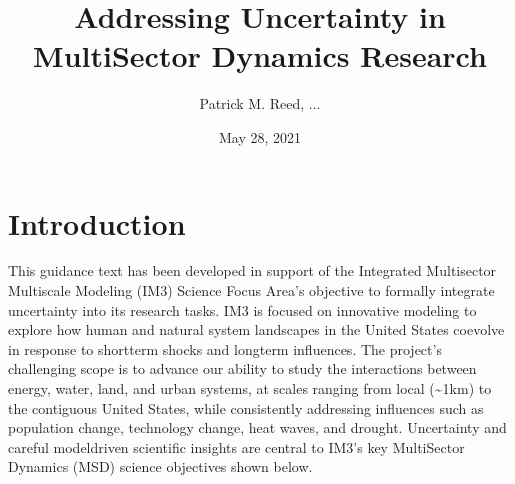 \documentclass[letterpaper,10pt,english]{sphinxmanual}
\title{Addressing Uncertainty in MultiSector Dynamics Research}
\date{May 28, 2021}
\author{Patrick M.\@{} Reed, ...\@{}}
\begin{document}
\pagestyle{empty}
\sphinxmaketitle
\pagestyle{plain}
\sphinxtableofcontents
\pagestyle{normal}
\label{\detokenize{index::doc}}



\chapter{Introduction}
\label{\detokenize{1_introduction:introduction}}\label{\detokenize{1_introduction::doc}}
\sphinxAtStartPar
This guidance text has been developed in support of the Integrated Multisector Multiscale Modeling (IM3) Science Focus Area’s objective to formally integrate uncertainty into its research tasks. IM3 is focused on innovative modeling to explore how human and natural system landscapes in the United States co\sphinxhyphen{}evolve in response to short\sphinxhyphen{}term shocks and long\sphinxhyphen{}term influences. The project’s challenging scope is to advance our ability to study the interactions between energy, water, land, and urban systems, at scales ranging from local (\textasciitilde{}1km) to the contiguous United States, while consistently addressing influences such as population change, technology change, heat waves, and drought. Uncertainty and careful model\sphinxhyphen{}driven scientific insights are central to IM3’s key MultiSector Dynamics (MSD) science objectives shown below.

\sphinxAtStartPar
{}

\sphinxAtStartPar
{}

\sphinxAtStartPar
{}

\sphinxAtStartPar
{}
\end{document}
